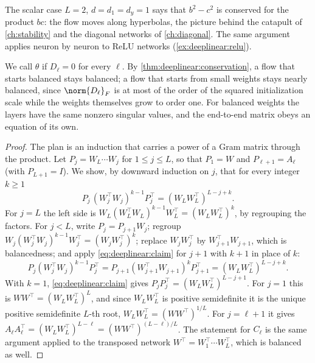 \begin{refsection}
The scalar case $L=2$, $d=d_1=d_y=1$ says that $b^2-c^2$ is conserved for the product $bc$: the flow moves along hyperbolas, the picture behind the catapult of \cref{ch:stability} and the diagonal networks of \cref{ch:diagonal}. The same argument applies neuron by neuron to ReLU networks (\cref{ex:deeplinear:relu}).

We call $\theta$  if $D_\ell=0$ for every $\ell$. By \cref{thm:deeplinear:conservation}, a flow that starts balanced stays balanced; a flow that starts from small weights stays nearly balanced, since $\norm{D_\ell}_F$ is at most of the order of the squared initialization scale while the weights themselves grow to order one. For balanced weights the layers have the same nonzero singular values, and the end-to-end matrix obeys an equation of its own.


\begin{proof}
The plan is an induction that carries a power of a Gram matrix through the product. Let $P_j=W_L\cdots W_j$ for $1\le j\le L$, so that $P_1=W$ and $P_{\ell+1}=A_\ell$ (with $P_{L+1}=I$). We show, by downward induction on $j$, that for every integer $k\ge1$
\begin{equation}\label{eq:deeplinear:claim}
  P_j\,(W_j^\top W_j)^{k-1}P_j^\top=(W_LW_L^\top)^{L-j+k}.
\end{equation}
For $j=L$ the left side is $W_L(W_L^\top W_L)^{k-1}W_L^\top=(W_LW_L^\top)^k$, by regrouping the factors. For $j<L$, write $P_j=P_{j+1}W_j$; regroup $W_j(W_j^\top W_j)^{k-1}W_j^\top=(W_jW_j^\top)^k$; replace $W_jW_j^\top$ by $W_{j+1}^\top W_{j+1}$, which is balancedness; and apply \eqref{eq:deeplinear:claim} for $j+1$ with $k+1$ in place of $k$:
\[
  P_j(W_j^\top W_j)^{k-1}P_j^\top=P_{j+1}(W_{j+1}^\top W_{j+1})^{k}P_{j+1}^\top=(W_LW_L^\top)^{L-j+k}.
\]
With $k=1$, \eqref{eq:deeplinear:claim} gives $P_jP_j^\top=(W_LW_L^\top)^{L-j+1}$. For $j=1$ this is $WW^\top=(W_LW_L^\top)^L$, and since $W_LW_L^\top$ is positive semidefinite it is the unique positive semidefinite $L$-th root, $W_LW_L^\top=(WW^\top)^{1/L}$. For $j=\ell+1$ it gives $A_\ell A_\ell^\top=(W_LW_L^\top)^{L-\ell}=(WW^\top)^{(L-\ell)/L}$. The statement for $C_\ell$ is the same argument applied to the transposed network $W^\top=W_1^\top\cdots W_L^\top$, which is balanced as well.
\end{proof}


\end{refsection}
